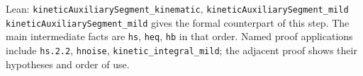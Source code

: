 \documentclass[11pt,a4paper]{article}
\begin{document}
\begin{leanbox}{Lean: \texttt{kineticAuxiliarySegment\_\allowbreak{}kinematic}, \texttt{kineticAuxiliarySegment\_\allowbreak{}mild}}
\texttt{kinetic\allowbreak{}Auxiliary\allowbreak{}Segment\_\allowbreak{}mild} gives the formal counterpart of this step. The main intermediate facts are \texttt{hs}, \texttt{heq}, \texttt{hb} in that order. Named proof applications include \texttt{hs.\allowbreak{}2.\allowbreak{}2}, \texttt{hnoise}, \texttt{kinetic\_\allowbreak{}integral\_\allowbreak{}mild}; the adjacent proof shows their hypotheses and order of use.
\end{leanbox}
\end{document}
